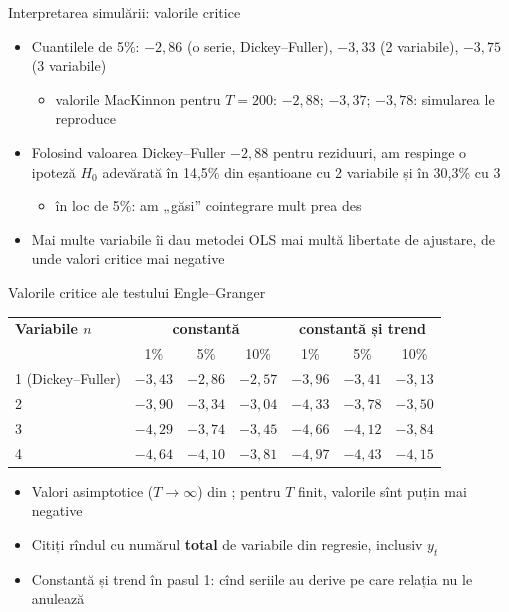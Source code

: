 \begin{frame}{Interpretarea simulării: valorile critice}
\itemsize{\small}
\begin{itemize}
    \item Cuantilele de 5\%: $-2{,}86$ (o serie, Dickey--Fuller), $-3{,}33$ (2 variabile), $-3{,}75$ (3 variabile)
    \begin{itemize}
        \item valorile MacKinnon pentru $T = 200$: $-2{,}88$; $-3{,}37$; $-3{,}78$: simularea le reproduce
    \end{itemize}
    \item Folosind valoarea Dickey--Fuller $-2{,}88$ pentru reziduuri, am respinge o ipoteză $H_0$ adevărată în 14{,}5\% din eșantioane cu 2 variabile și în 30{,}3\% cu 3
    \begin{itemize}
        \item în loc de 5\%: am „găsi” cointegrare mult prea des
    \end{itemize}
    \item Mai multe variabile îi dau metodei OLS mai multă libertate de ajustare, de unde valori critice mai negative
\end{itemize}
\end{frame}

\begin{frame}{Valorile critice ale testului Engle--Granger}
\itemsize{\small}
\begin{center}
\footnotesize
\begin{tabular}{lcccccc}
\toprule
\textbf{Variabile $n$} & \multicolumn{3}{c}{\textbf{constantă}} & \multicolumn{3}{c}{\textbf{constantă și trend}} \\
 & 1\% & 5\% & 10\% & 1\% & 5\% & 10\% \\
\midrule
1 (Dickey--Fuller) & $-3{,}43$ & $-2{,}86$ & $-2{,}57$ & $-3{,}96$ & $-3{,}41$ & $-3{,}13$ \\
2 & $-3{,}90$ & $-3{,}34$ & $-3{,}04$ & $-4{,}33$ & $-3{,}78$ & $-3{,}50$ \\
3 & $-4{,}29$ & $-3{,}74$ & $-3{,}45$ & $-4{,}66$ & $-4{,}12$ & $-3{,}84$ \\
4 & $-4{,}64$ & $-4{,}10$ & $-3{,}81$ & $-4{,}97$ & $-4{,}43$ & $-4{,}15$ \\
\bottomrule
\end{tabular}
\end{center}
\begin{itemize}
    \item Valori asimptotice ($T \to \infty$) din ; pentru $T$ finit, valorile sînt puțin mai negative
    \item Citiți rîndul cu numărul \textbf{total} de variabile din regresie, inclusiv $y_t$
    \item Constantă și trend în pasul 1: cînd seriile au derive pe care relația nu le anulează
\end{itemize}
\end{frame}

